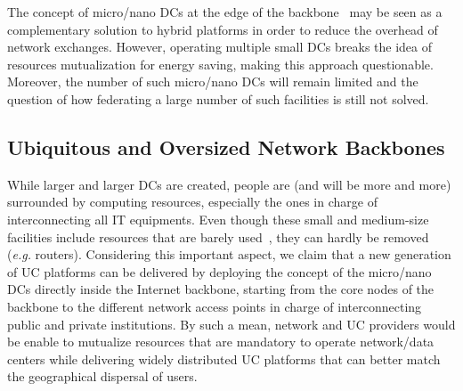 The concept of micro/nano DCs at the edge of the 
backbone~\cite{greenberg:sigcomm09} may be seen as a complementary solution to hybrid
platforms in order to reduce the overhead of network exchanges.  However, operating multiple small DCs breaks
the idea of resources mutualization for energy saving, making this approach questionable. 
Moreover, 
the number of such micro/nano DCs will remain limited and the question of how
federating a large number of such facilities is still not solved.


\subsection{Ubiquitous and Oversized Network Backbones}
While larger and larger DCs are created, people are (and will be more and more)
surrounded by computing resources, especially the ones in charge of
interconnecting all IT equipments. Even though these small and medium-size
facilities include resources that are barely used~\cite{Andrew:2003,
Benson:2010}, they can hardly be removed (\textit{e.g.} routers).  Considering
this important aspect, we claim that a new generation of UC platforms can be
delivered by deploying the concept of the  micro/nano DCs directly inside the
Internet backbone, starting from the core nodes of the backbone to the
different network access points in charge of interconnecting public and private
institutions.  By such a mean, network and UC providers would be enable to
mutualize resources that are mandatory to operate network/data centers while
delivering widely distributed UC platforms that can better match the
geographical dispersal of users. 


